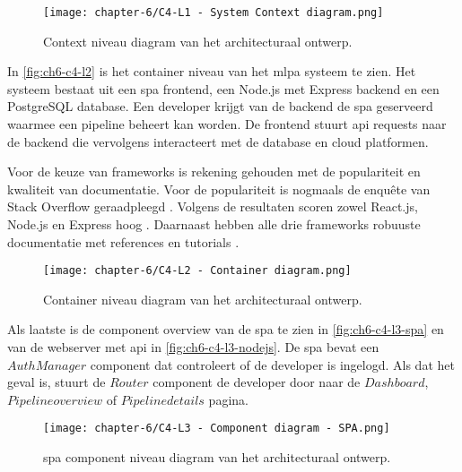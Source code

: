 \begin{figure}[hbt!]
  \centering
  \texttt{[image: chapter-6/C4-L1 - System Context diagram.png]}
  \caption{Context niveau diagram van het architecturaal ontwerp.}
  \label{fig:ch6-c4-l1}
\end{figure}

In \autoref{fig:ch6-c4-l2} is het container niveau van het \Acrshort{mlpa} systeem te zien. Het systeem bestaat uit een \acrfull{spa} frontend, een Node.js met Express backend en een PostgreSQL database. Een developer krijgt van de backend de \Acrshort{spa} geserveerd waarmee een pipeline beheert kan worden. De frontend stuurt \Acrshort{api} requests naar de backend die vervolgens interacteert met de database en cloud platformen.

Voor de keuze van frameworks is rekening gehouden met de populariteit en kwaliteit van documentatie. Voor de populariteit is nogmaals de enquête van Stack Overflow geraadpleegd \cite{stack-overflow-survey-2020}. Volgens de resultaten scoren zowel React.js, Node.js en Express hoog \cite{stack-overflow-survey-2020-technology-web-frameworks} \cite{stack-overflow-survey-2020-popular-framework-libraries-tools}. Daarnaast hebben alle drie frameworks robuuste documentatie met references en tutorials \cite{reactjs-docs} \cite{nodejs-docs} \cite{expressjs-docs}.

\begin{figure}[hbt!]
  \centering
  \texttt{[image: chapter-6/C4-L2 - Container diagram.png]}
  \caption{Container niveau diagram van het architecturaal ontwerp.}
  \label{fig:ch6-c4-l2}
\end{figure}

\newpage

Als laatste is de component overview van de \acrshort{spa} te zien in \autoref{fig:ch6-c4-l3-spa} en van de webserver met \acrshort{api} in \autoref{fig:ch6-c4-l3-nodejs}. De \acrshort{spa} bevat een \(AuthManager\) component dat controleert of de developer is ingelogd. Als dat het geval is, stuurt de \(Router\) component de developer door naar de \(Dashboard\), \(Pipeline overview\) of \(Pipeline details\) pagina.

\begin{figure}[hbt!]
  \centering
  \texttt{[image: chapter-6/C4-L3 - Component diagram - SPA.png]}
  \caption{\Acrfull{spa} component niveau diagram van het architecturaal ontwerp.}
  \label{fig:ch6-c4-l3-spa}
\end{figure}

